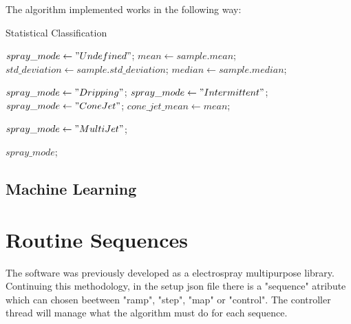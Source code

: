	The algorithm implemented works in the following way:
	\begin{algorithm}
        \caption{Statistical Classification}\label{alg:statistical_class}
        \begin{algorithmic}

            \State $spray\_mode \gets "Undefined"$;
            \State $mean \gets sample.mean$; 
            \State $std\_deviation \gets sample.std\_deviation$;
            \State $median \gets sample.median$;
            
                \State $spray\_mode \gets "Dripping"$;
                \State $spray\_ mode \gets "Intermittent"$;
                \State $spray\_ mode \gets "Cone Jet"$;
                \State $cone\_jet\_mean \gets mean$;
            \EndIf

            \EndIf

                    \State $spray\_ mode \gets "Multi Jet"$;
                \EndIf
            \EndIf

            \Return $spray\_ mode$;
        \EndFunction
        \end{algorithmic}
    \end{algorithm}


\subsection{Machine Learning}


\section{Routine Sequences}
\label{sec:routine_sequences}

    The software was previously developed as a electrospray multipurpose library\cite{Monica}. 
    Continuing this methodology, in the setup json file there is a "sequence" atribute which can chosen beetween "ramp", "step", "map" or "control".
    The controller thread will manage what the algorithm must do for each sequence.

